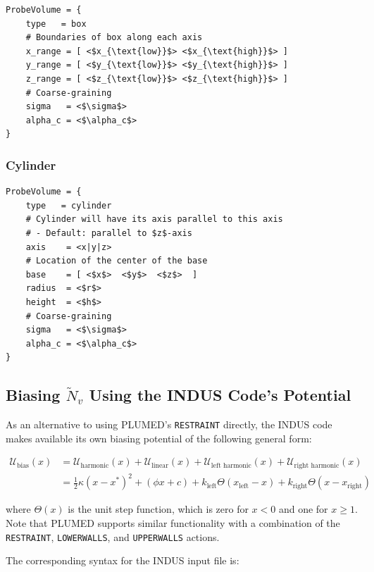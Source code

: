 \documentclass[11pt,notitlepage]{article}
\begin{document}
\begin{lstlisting}
ProbeVolume = {
	type   = box
	# Boundaries of box along each axis
	x_range = [ <$x_{\text{low}}$> <$x_{\text{high}}$> ]
	y_range = [ <$y_{\text{low}}$> <$y_{\text{high}}$> ]
	z_range = [ <$z_{\text{low}}$> <$z_{\text{high}}$> ]
	# Coarse-graining
	sigma   = <$\sigma$>
	alpha_c = <$\alpha_c$>
}
\end{lstlisting}


\subsubsection{Cylinder}

\begin{lstlisting}
ProbeVolume = {
	type   = cylinder
	# Cylinder will have its axis parallel to this axis 
	# - Default: parallel to $z$-axis
	axis    = <x|y|z>
	# Location of the center of the base
	base    = [ <$x$>  <$y$>  <$z$>  ]
	radius  = <$r$>
	height  = <$h$>
	# Coarse-graining
	sigma   = <$\sigma$>
	alpha_c = <$\alpha_c$>
}
\end{lstlisting}


\subsection{Biasing $\tilde{N}_v$ Using the INDUS Code's Potential}

As an alternative to using PLUMED's \texttt{RESTRAINT} directly, the INDUS code makes available its own biasing potential of the following general form:

\begin{align}
	\mathcal{U}_{\text{bias}}(x) 
	&= \mathcal{U}_{\text{harmonic}}(x) + \mathcal{U}_{\text{linear}}(x)
	     + \mathcal{U}_{\text{left harmonic}}(x) + \mathcal{U}_{\text{right harmonic}}(x) \\
	\label{eqn:generalbias}
	&= \frac{1}{2} \kappa (x - x^*)^2 + (\phi x + c)
	     + k_{\text{left}} \Theta(x_{\text{left}} - x) + k_{\text{right}} \Theta(x - x_{\text{right}})
\end{align}

\noindent where $\Theta(x)$ is the unit step function, which is zero for $x < 0$ and one for $x \ge 1$. Note that PLUMED supports similar functionality with a combination of the \texttt{RESTRAINT}, \texttt{LOWERWALLS}, and \texttt{UPPERWALLS} actions.

The corresponding syntax for the INDUS input file is:
\end{document}
